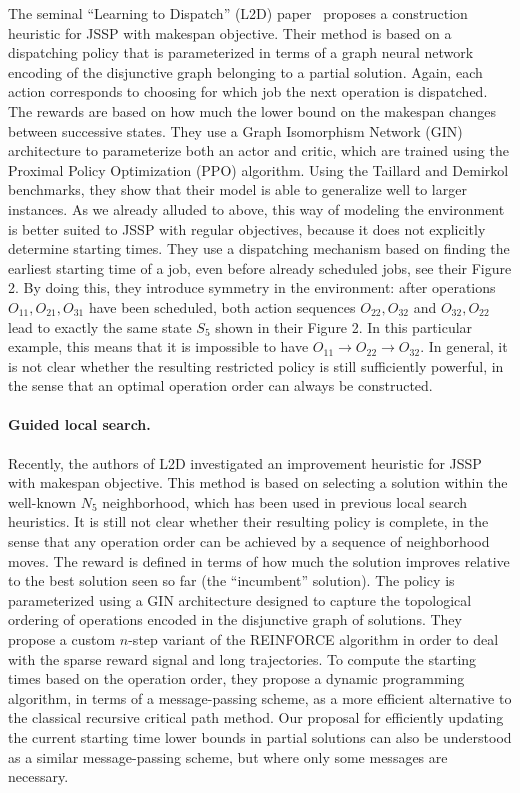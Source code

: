 \documentclass[a4paper]{report}
\theoremstyle{definition}
\theoremstyle{plain}
\begin{document}
The seminal ``Learning to Dispatch'' (L2D)
paper~\cite{zhangLearningDispatchJob2020} proposes a construction heuristic for
JSSP with makespan objective. Their method is based on a dispatching policy that
is parameterized in terms of a graph neural network encoding of the disjunctive
graph belonging to a partial solution. Again, each action corresponds to
choosing for which job the next operation is dispatched. The rewards are based
on how much the lower bound on the makespan changes between successive states.
They use a Graph Isomorphism Network (GIN) architecture to parameterize both an
actor and critic, which are trained using the Proximal Policy Optimization (PPO)
algorithm. Using the Taillard and Demirkol benchmarks, they show that their
model is able to generalize well to larger instances.
As we already alluded to above, this way of modeling the environment is better
suited to JSSP with regular objectives, because it does not explicitly determine
starting times.
%
They use a dispatching mechanism based on finding the earliest starting time of
a job, even before already scheduled jobs, see their Figure 2. By doing this,
they introduce symmetry in the environment: after operations
$O_{11}, O_{21}, O_{31}$ have been scheduled, both action sequences
$O_{22}, O_{32}$ and $O_{32}, O_{22}$ lead to exactly the same state $S_5$ shown
in their Figure 2. In this particular example, this means that it is impossible
to have $O_{11} \rightarrow O_{22} \rightarrow O_{32}$. In general, it is not
clear whether the resulting restricted policy is still sufficiently powerful, in
the sense that an optimal operation order can always be constructed.


\paragraph{Guided local search.}
Recently, the authors of L2D investigated an improvement heuristic for
JSSP~\cite{zhangDeepReinforcementLearning2024} with makespan objective.
%
This method is based on selecting a solution within the well-known $N_5$
neighborhood, which has been used in previous local search heuristics.
%
It is still not clear whether their resulting policy is complete, in the sense
that any operation order can be achieved by a sequence of neighborhood moves.
%
The reward is defined in terms of how much the solution improves relative to the
best solution seen so far (the ``incumbent'' solution). The policy is
parameterized using a GIN architecture designed to capture the topological
ordering of operations encoded in the disjunctive graph of solutions. They
propose a custom $n$-step variant of the REINFORCE algorithm in order to deal
with the sparse reward signal and long trajectories.
%
To compute the starting times based on the operation order, they propose a
dynamic programming algorithm, in terms of a message-passing scheme, as a more
efficient alternative to the classical recursive critical path method.
%
Our proposal for efficiently updating the current starting time lower bounds in
partial solutions can also be understood as a similar message-passing scheme,
but where only some messages are necessary.
\end{document}
